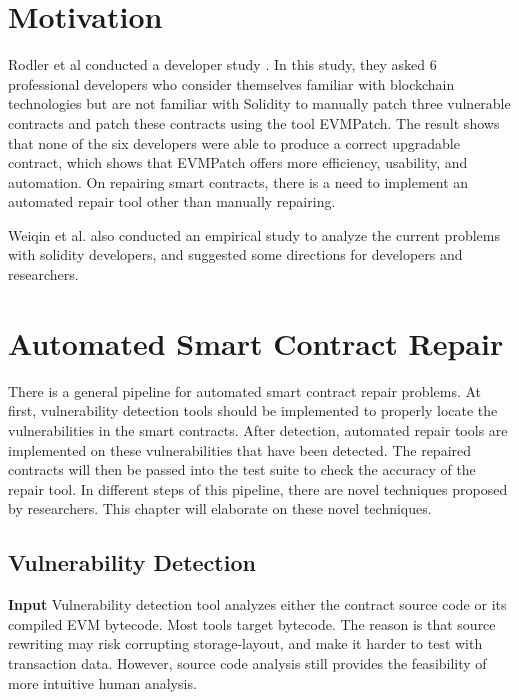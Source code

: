 \documentclass[sigplan,screen]{acmart}
\begin{document}
\section{Motivation}
Rodler et al conducted a developer study \cite{rodler2021evmpatch}. In this study, they asked 6 professional developers who consider themselves familiar with blockchain technologies but are not familiar with Solidity to manually patch three vulnerable contracts and patch these contracts using the tool EVMPatch. The result shows that none of the six developers were able to produce a correct upgradable contract, which shows that EVMPatch offers more efficiency, usability, and automation. On repairing smart contracts, there is a need to implement an automated repair tool other than manually repairing.



Weiqin et al. \cite{zou2019smart} also conducted an empirical study to analyze the current problems with solidity developers, and suggested some directions for developers and researchers.


\section{Automated Smart Contract Repair}

There is a general pipeline for automated smart contract repair problems.
At first, vulnerability detection tools should be implemented to properly locate the vulnerabilities in the smart contracts. After detection, automated repair tools are implemented on these vulnerabilities that have been detected. The repaired contracts will then be passed into the test suite to check the accuracy of the repair tool. In different steps of this pipeline, there are novel techniques proposed by researchers. This chapter will elaborate on these novel techniques.



\subsection{Vulnerability Detection}

\textbf{Input}
Vulnerability detection tool analyzes either the contract source code or its compiled EVM bytecode. Most tools target bytecode. The reason is that source rewriting may risk corrupting storage-layout, and make it harder to test with transaction data. However, source code analysis still provides the feasibility of more intuitive human analysis.
\end{document}
